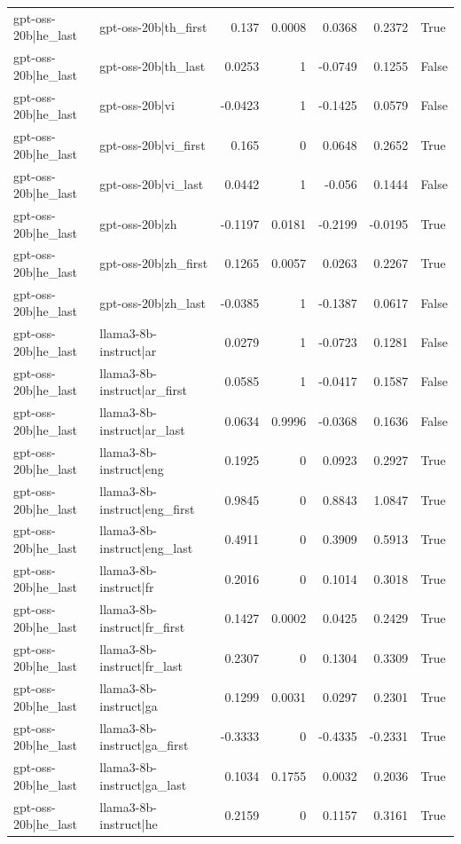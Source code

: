 \begin{table}
\begin{tabular}{l l r r r r l}
gpt-oss-20b|he_last & gpt-oss-20b|th_first & 0.137 & 0.0008 & 0.0368 & 0.2372 & True \\
gpt-oss-20b|he_last & gpt-oss-20b|th_last & 0.0253 & 1 & -0.0749 & 0.1255 & False \\
gpt-oss-20b|he_last & gpt-oss-20b|vi & -0.0423 & 1 & -0.1425 & 0.0579 & False \\
gpt-oss-20b|he_last & gpt-oss-20b|vi_first & 0.165 & 0 & 0.0648 & 0.2652 & True \\
gpt-oss-20b|he_last & gpt-oss-20b|vi_last & 0.0442 & 1 & -0.056 & 0.1444 & False \\
gpt-oss-20b|he_last & gpt-oss-20b|zh & -0.1197 & 0.0181 & -0.2199 & -0.0195 & True \\
gpt-oss-20b|he_last & gpt-oss-20b|zh_first & 0.1265 & 0.0057 & 0.0263 & 0.2267 & True \\
gpt-oss-20b|he_last & gpt-oss-20b|zh_last & -0.0385 & 1 & -0.1387 & 0.0617 & False \\
gpt-oss-20b|he_last & llama3-8b-instruct|ar & 0.0279 & 1 & -0.0723 & 0.1281 & False \\
gpt-oss-20b|he_last & llama3-8b-instruct|ar_first & 0.0585 & 1 & -0.0417 & 0.1587 & False \\
gpt-oss-20b|he_last & llama3-8b-instruct|ar_last & 0.0634 & 0.9996 & -0.0368 & 0.1636 & False \\
gpt-oss-20b|he_last & llama3-8b-instruct|eng & 0.1925 & 0 & 0.0923 & 0.2927 & True \\
gpt-oss-20b|he_last & llama3-8b-instruct|eng_first & 0.9845 & 0 & 0.8843 & 1.0847 & True \\
gpt-oss-20b|he_last & llama3-8b-instruct|eng_last & 0.4911 & 0 & 0.3909 & 0.5913 & True \\
gpt-oss-20b|he_last & llama3-8b-instruct|fr & 0.2016 & 0 & 0.1014 & 0.3018 & True \\
gpt-oss-20b|he_last & llama3-8b-instruct|fr_first & 0.1427 & 0.0002 & 0.0425 & 0.2429 & True \\
gpt-oss-20b|he_last & llama3-8b-instruct|fr_last & 0.2307 & 0 & 0.1304 & 0.3309 & True \\
gpt-oss-20b|he_last & llama3-8b-instruct|ga & 0.1299 & 0.0031 & 0.0297 & 0.2301 & True \\
gpt-oss-20b|he_last & llama3-8b-instruct|ga_first & -0.3333 & 0 & -0.4335 & -0.2331 & True \\
gpt-oss-20b|he_last & llama3-8b-instruct|ga_last & 0.1034 & 0.1755 & 0.0032 & 0.2036 & True \\
gpt-oss-20b|he_last & llama3-8b-instruct|he & 0.2159 & 0 & 0.1157 & 0.3161 & True \\

\end{tabular}
\end{table}
